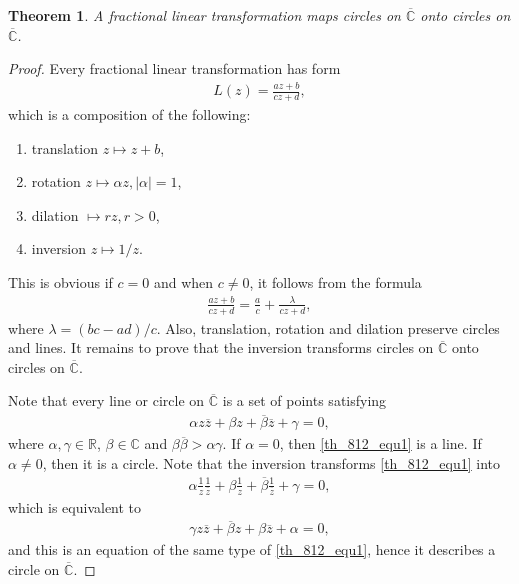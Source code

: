 \documentclass[11pt]{book}
\newtheorem{theorem}{Theorem}[chapter]
\theoremstyle{definition}
\numberwithin{equation}{chapter}
\begin{document}
\begin{theorem}
A fractional linear transformation maps circles on $\overline{\mathbb{C}}$ onto circles on $\overline{\mathbb{C}}$.
\end{theorem}
\begin{proof}
Every fractional linear transformation has form
\begin{align*}
    L(z) = \frac{az + b}{cz + d},
\end{align*}
which is a composition of the following:
\begin{enumerate}[label=(\alph*)]
    \item translation $z \mapsto z + b$, 
    
    \item rotation $z \mapsto \alpha z, \left|\alpha\right| = 1$,
    
    \item dilation $ \mapsto rz, r > 0$, 
    
    \item inversion $z \mapsto 1/z$.
\end{enumerate}
This is obvious if $c = 0$ and when $c \neq 0$, it follows from the formula
\begin{align*}
    \frac{az + b}{cz + d} = \frac{a}{c} + \frac{\lambda}{cz + d},
\end{align*}
where $\lambda = (bc - ad)/c$. Also, translation, rotation and dilation preserve circles and lines. It remains to prove that the inversion transforms circles on $\overline{\mathbb{C}}$ onto circles on $\overline{\mathbb{C}}$. 

Note that every line or circle on $\overline{\mathbb{C}}$ is a set of points satisfying 
\begin{align}\label{th_812_equ1}
    \alpha z \overline{z} + \beta z + \overline{\beta} \overline{z} + \gamma = 0,
\end{align}
where $\alpha, \gamma \in \mathbb{R}$, $\beta \in \mathbb{C}$ and $\beta \overline{\beta} > \alpha \gamma$. If $\alpha = 0$, then \eqref{th_812_equ1} is a line. If $\alpha \neq 0$, then it is a circle. Note that the inversion transforms \eqref{th_812_equ1} into
\begin{align*}
    \alpha \frac{1}{z} \frac{1}{\overline{z}} + \beta \frac{1}{z} + \overline{\beta} \frac{1}{\overline{z}} + \gamma = 0,
\end{align*}
which is equivalent to
\begin{align}\label{th_812_equ2}
    \gamma z \overline{z} + \overline{\beta} z + \beta \overline{z} + \alpha = 0,
\end{align}
and this is an equation of the same type of \eqref{th_812_equ1}, hence it describes a circle on $\overline{\mathbb{C}}$. 
\end{proof}
\end{document}
